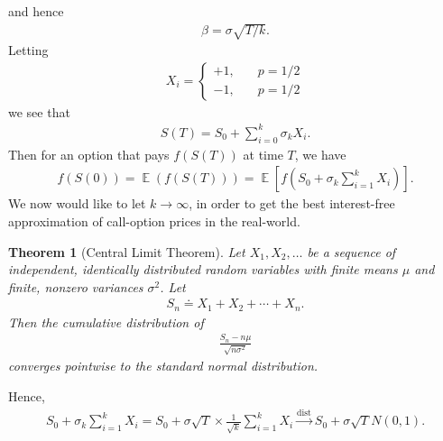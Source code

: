 \documentclass[12pt]{article}
\DeclareMathOperator{\ex}{\mathbb{E}}
\theoremstyle{plain}
\newtheorem{theorem}{Theorem}
\theoremstyle{definition}
\theoremstyle{remark}
\numberwithin{equation}{section}  %
\begin{document}
	and hence
	\begin{equation*}
		\begin{split}
			\beta = \sigma \sqrt{T/k}.
		\end{split}
	\end{equation*}
	Letting
	\begin{equation*}
		\begin{split}
			X_{i} = 
			\begin{cases}
				+1, & \quad p=1/2 \\
				-1, & \quad p=1/2
			\end{cases}
		\end{split}
	\end{equation*}
	we see that
	\begin{equation*}
		\begin{split}
			S(T) = S_{0} + \sum_{i = 0}^{k} \sigma_{k} X_{i}.
		\end{split}
	\end{equation*}
	Then for an option that pays $f(S(T))$ at time $T$, we have
	\begin{equation*}
		\begin{split}
			f(S(0)) = \ex(f(S(T)))
			= \ex[f(S_{0} + \sigma_{k} \sum_{i=1}^{k} X_{i})].
		\end{split}
	\end{equation*}
	We now would like to let $k \to \infty$, in order to get the best interest-free
	approximation of call-option prices in the real-world.
	\begin{theorem}[Central Limit Theorem]\label{thm:central-lim-thm}
		Let $X_{1}, X_{2}, \ldots$ be a sequence of independent, identically
		distributed random variables with finite means $\mu$ and finite, nonzero
		variances $\sigma^{2}$. Let
		\begin{equation*}
			\begin{split}
				S_{n} \doteq X_{1} + X_{2} + \cdots + X_{n}.
			\end{split}
		\end{equation*}
		Then the cumulative distribution of 
		\begin{equation*}
			\begin{split}
				\frac{S_{n} - n \mu}{\sqrt{n \sigma^{2}}}
			\end{split}
		\end{equation*}
		converges pointwise to the standard normal distribution.
	\end{theorem}
	Hence,
	\begin{equation*}
		\begin{split}
			S_{0} + \sigma_{k} \sum_{i = 1}^{k} X_{i}
			= S_{0} + \sigma \sqrt{T} \times \frac{1}{\sqrt{k}} \sum_{i = 1}^{k}
			X_{i}
			\xrightarrow{\text{dist}} S_{0} + \sigma \sqrt{T} N(0,1).
		\end{split}
	\end{equation*}
\end{document}
